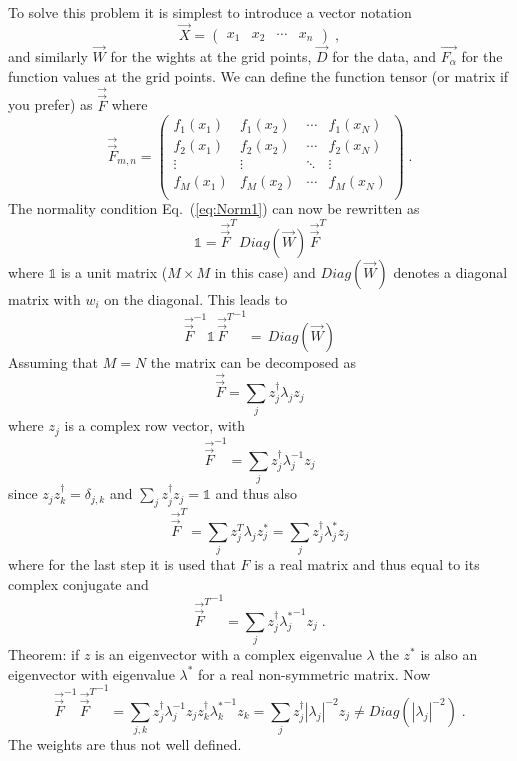\documentclass[fleqn,11pt]{article}
\def\beq{\begin{equation}}
\def\eeq{\end{equation}}
\def\eqref#1{Eq.~(\ref{eq:#1})}
\begin{document}
To solve this problem it is simplest to introduce a vector notation
\beq
\overrightarrow{X} =
\begin{pmatrix}  %
x_1 & x_2 & \cdots & x_n 
\end{pmatrix}
 \;,
\eeq
and similarly $\overrightarrow{W}$ for the wights at the grid points, $\overrightarrow{D}$ for the data, and $\overrightarrow{F_\alpha}$ for the function values at the grid points. We can define the function tensor (or matrix if you prefer) as $\overrightarrow{\overrightarrow{F}}$ where
\begin{equation*}
\overrightarrow{\overrightarrow{F}}_{m,n} =
\begin{pmatrix}  %
f_1(x_1) & f_1(x_2) & \cdots & f_1(x_N) \\
f_2(x_1) & f_2(x_2) & \cdots & f_2(x_N) \\
\vdots  & \vdots  & \ddots & \vdots  \\
f_M(x_1) & f_M(x_2) & \cdots & f_M(x_N) \\
\end{pmatrix}
\;.
\end{equation*}
The normality condition \eqref{Norm1} can now be rewritten as 
\beq %
\mathbb{1} = \overrightarrow{\overrightarrow{F}}^T \, Diag(\overrightarrow{W}) \, \overrightarrow{\overrightarrow{F}}^T
\eeq
where $\mathbb{1}$ is a unit matrix ($M\times M$ in this case) and $Diag(\overrightarrow{W})$ denotes a diagonal matrix with $w_i$ on the diagonal. This leads to
\beq %
\overrightarrow{\overrightarrow{F}}^{-1}  \mathbb{1} \, {\overrightarrow{\overrightarrow{F}}^T}^{-1}= \, Diag(\overrightarrow{W}) 
\eeq
Assuming that $M=N $ the matrix can be decomposed as 
\beq
\overrightarrow{\overrightarrow{F}} = \sum_j z^\dagger_j \lambda_j z_j
\eeq
where $z_j$ is a complex row vector, with
\beq
\overrightarrow{\overrightarrow{F}}^{-1} = \sum_j z^\dagger_j \lambda_j^{-1} z_j
\eeq
since $z_j z^\dagger_k=\delta_{j,k}$ and $\sum_j z^\dagger_j z_j =\mathbb{1}$ and thus also
\beq
\overrightarrow{\overrightarrow{F}}^T = \sum_j z^T_j \lambda_j z^*_j  = \sum_j z^\dagger_j \lambda_j^* z_j
\eeq
where for the last step it is used that $F$ is a real matrix and thus equal to its complex conjugate and
\beq
{\overrightarrow{\overrightarrow{F}}^T}^{-1} = \sum_j z^\dagger_j {\lambda_j^*}^{-1} z_j \;.
\eeq
Theorem: if $z$ is an eigenvector with a complex eigenvalue $\lambda$ the $z^*$ is also an eigenvector with eigenvalue $\lambda^*$ for a real non-symmetric matrix.
Now 
\beq %
\overrightarrow{\overrightarrow{F}}^{-1}  \, {\overrightarrow{\overrightarrow{F}}^T}^{-1}= \sum_{j,k} z^\dagger_j \lambda_j^{-1} z_j z^\dagger_k {\lambda_k^*}^{-1} z_k = \sum_{j} z^\dagger_j |\lambda_j|^{-2} z_j \neq Diag(|\lambda_j|^{-2}) \;.
\eeq
The weights are thus not well defined.
\end{document}
